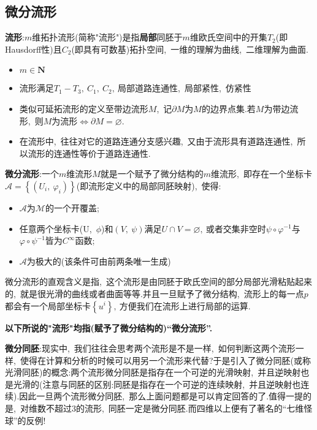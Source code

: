 \subsection{微分流形}
\textbf{流形}:$m$维拓扑流形(简称"流形")是指\textbf{局部}同胚于$m$维欧氏空间中的开集$T_2$(即Hausdorff性)且$C_2$(即具有可数基)拓扑空间,\ 一维的理解为曲线,\ 二维理解为曲面.
\begin{note}
	\begin{itemize}
		\item $m\in\textbf{N}$
		\item 流形满足$T_1-T_3,\ C_1,\ C_2,\ $局部道路连通性,\ 局部紧性,\ 仿紧性
		\item 类似可延拓流形的定义至带边流形$M$,\ 记$\partial M$为$M$的边界点集.若$M$为带边流形,\ 则$M$为流形$\Leftrightarrow\partial M=\varnothing.$
		\item 在流形中,\ 往往对它的道路连通分支感兴趣,\ 又由于流形具有道路连通性,\ 所以流形的连通性等价于道路连通性.
	\end{itemize}
\end{note}
\textbf{微分流形}:一个$m$维流形$M$就是一个赋予了微分结构的$m$维流形,\ 即存在一个坐标卡$\mathcal{A}=\left\{\left(U_i,\ \varphi_i\right)\right\}$(即流形定义中的局部同胚映射),\ 使得:
\begin{itemize}
	\item $\mathcal{A}\text{为}\mathcal{M}$的一个开覆盖;
	\item 任意两个坐标卡(U,\ $\phi$)和$\left(V,\ \psi\right)$满足$U\cap V=\varnothing,\ $或者交集非空时$\psi\circ\varphi^{-1}$与$\varphi\circ\psi^{-1}$皆为$C^{\infty}$函数;
	\item $\mathcal{A}$为极大的(该条件可由前两条唯一生成)
\end{itemize}

微分流形的直观含义是指,\ 这个流形是由同胚于欧氏空间的部分局部光滑粘贴起来的,\ 就是很光滑的曲线或者曲面等等.并且一旦赋予了微分结构,\ 流形上的每一点$p$都会有一个局部坐标卡$\left\{u^i\right\},\ $方便我们在流形上进行局部的运算.

\textbf{以下所说的"流形"均指(赋予了微分结构的)“微分流形”.}

\textbf{微分同胚}:现实中,\ 我们往往会思考两个流形是不是一样,\ 如何判断这两个流形一样,\ 使得在计算和分析的时候可以用另一个流形来代替?于是引入了微分同胚(或称光滑同胚)的概念:两个流形微分同胚是指存在一个可逆的光滑映射,\ 并且逆映射也是光滑的(注意与同胚的区别:同胚是指存在一个可逆的连续映射,\ 并且逆映射也连续).因此一旦两个流形微分同胚,\ 那么上面问题都是可以肯定回答的了.值得一提的是,\ 对维数不超过3的流形,\ 同胚一定是微分同胚.而四维以上便有了著名的“七维怪球”的反例!

